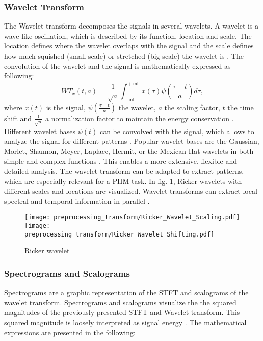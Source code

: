 \subsubsection{Wavelet Transform}
The Wavelet transform decomposes the signals in several wavelets. A wavelet is a wave-like oscillation, which is described by its function, location and scale. The location defines where the wavelet overlaps with the signal and the scale defines how much squished (small scale) or stretched (big scale) the wavelet is \cite{Sifuzzaman2009}. The convolution of the wavelet and the signal is mathematically expressed as following:
\begin{equation}
    WT_{x}(t,a) = \frac{1}{\sqrt{a}} \int_{- \inf}^{+ \inf} x(\tau) \psi(\frac{\tau -t}{a}) d \tau,
\end{equation}
 where $x(t)$ is the signal, $\psi(\frac{\tau -t}{a})$ the wavelet, $a$ the scaling factor, $t$ the time shift and $\frac{1}{\sqrt{a}}$ a normalization factor to maintain the energy conservation \cite{FENG2013}. Different wavelet bases $\psi(t)$ can be convolved with the signal, which allows to analyze the signal for different patterns \cite{Sifuzzaman2009}. Popular wavelet bases are the Gaussian, Morlet, Shannon, Meyer, Laplace, Hermit, or the Mexican Hat wavelets in both simple and complex functions \cite{Verstraete2017}. This enables a more extensive, flexible and detailed analysis. The wavelet transform can be adapted to extract patterns, which are especially relevant for a PHM task. In fig. \ref{fig:ricker_wavelet}, Ricker wavelets with different scales and locations are visualized. Wavelet transforms can extract local spectral and temporal information in parallel \cite{Sifuzzaman2009}.


\begin{figure}[H]
  \centering
  \texttt{[image: preprocessing\_transform/Ricker\_Wavelet\_Scaling.pdf]}
  \hspace{.1cm}
  \texttt{[image: preprocessing\_transform/Ricker\_Wavelet\_Shifting.pdf]}
  

  \caption{Ricker wavelet}
  \label{fig:ricker_wavelet}
\end{figure}

\subsubsection{Spectrograms and Scalograms}

 Spectrograms are a graphic representation of the STFT and scalograms of the wavelet transform. Spectrograms and scalograms visualize the the squared magnitudes of the previously presented STFT and Wavelet transform. This squared magnitude is loosely interpreted as signal energy \cite{Hlawatsch1992}. The mathematical expressions are presented in the following: 

